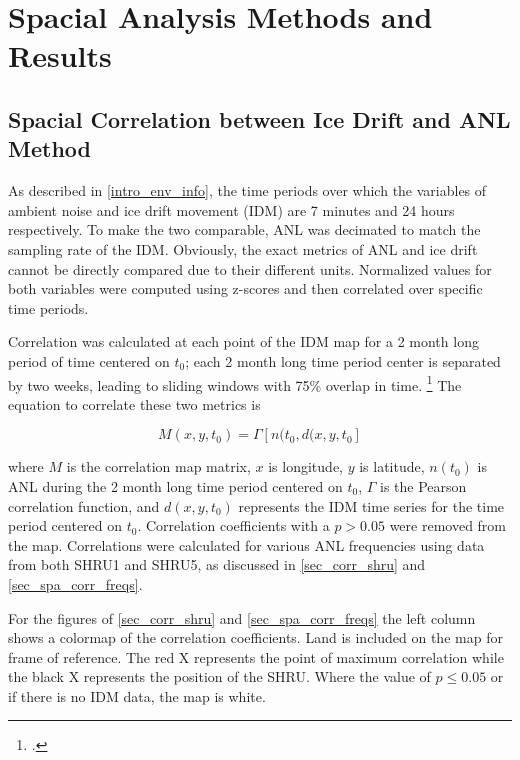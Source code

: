 \section{Spacial Analysis Methods and Results}


\subsection{Spacial Correlation between Ice Drift and ANL Method} \label{sec_corr_method}

As described in \autoref{intro_env_info}, the time periods over which the variables of ambient noise and ice drift movement (IDM) are 7 minutes and 24 hours respectively. To make the two comparable, ANL was decimated to match the sampling rate of the IDM. Obviously, the exact metrics of ANL and ice drift cannot be directly compared due to their different units. Normalized values for both variables were computed using z-scores and then correlated over specific time periods. 

Correlation was calculated at each point of the IDM map for a 2 month long period of time centered on $t_{0}$; each 2 month long time period center is separated by two weeks, leading to sliding windows with 75\% overlap in time. \footcite[]{Bonnel2021} The equation to correlate these two metrics is 

\begin{equation}    \label{eq_spacialcorr}
    M(x,y,t_{0})=\Gamma [n(t_{0},d(x,y,t_{0}]
\end{equation}
 
where $M$ is the correlation map matrix, $x$ is longitude, $y$ is latitude, $n(t_0)$ is ANL during the 2 month long time period centered on $t_0$, $\Gamma$ is the Pearson correlation function, and $d(x,y,t_{0})$ represents the IDM time series for the time period centered on $t_0$. Correlation coefficients with a $p>0.05$ were removed from the map. Correlations were calculated for various ANL frequencies using data from both SHRU1 and SHRU5, as discussed in \autoref{sec_corr_shru} and \autoref{sec_spa_corr_freqs}.%


For the figures of \autoref{sec_corr_shru} and \autoref{sec_spa_corr_freqs} the left column shows a colormap of the correlation coefficients. Land is included on the map for frame of reference. The red X represents the point of maximum correlation while the black X represents the position of the SHRU. Where the value of $p\leq0.05$ or if there is no IDM data, the map is white. 

